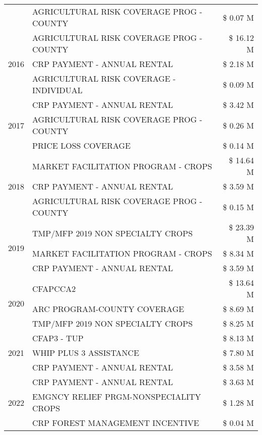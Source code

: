 \begin{tabular}{llr}
 & AGRICULTURAL RISK COVERAGE PROG - COUNTY & \$ 0.07 M \\
\cline{1-3}
\multirow[t]{3}{*}{2016} & AGRICULTURAL RISK COVERAGE PROG - COUNTY & \$ 16.12 M \\
 & CRP PAYMENT - ANNUAL RENTAL & \$ 2.18 M \\
 & AGRICULTURAL RISK COVERAGE - INDIVIDUAL & \$ 0.09 M \\
\cline{1-3}
\multirow[t]{3}{*}{2017} & CRP PAYMENT - ANNUAL RENTAL & \$ 3.42 M \\
 & AGRICULTURAL RISK COVERAGE PROG - COUNTY & \$ 0.26 M \\
 & PRICE LOSS COVERAGE & \$ 0.14 M \\
\cline{1-3}
\multirow[t]{3}{*}{2018} & MARKET FACILITATION PROGRAM - CROPS & \$ 14.64 M \\
 & CRP PAYMENT - ANNUAL RENTAL & \$ 3.59 M \\
 & AGRICULTURAL RISK COVERAGE PROG - COUNTY & \$ 0.15 M \\
\cline{1-3}
\multirow[t]{3}{*}{2019} & TMP/MFP 2019 NON SPECIALTY CROPS & \$ 23.39 M \\
 & MARKET FACILITATION PROGRAM - CROPS & \$ 8.34 M \\
 & CRP PAYMENT - ANNUAL RENTAL & \$ 3.59 M \\
\cline{1-3}
\multirow[t]{3}{*}{2020} & CFAPCCA2 & \$ 13.64 M \\
 & ARC PROGRAM-COUNTY COVERAGE & \$ 8.69 M \\
 & TMP/MFP 2019 NON SPECIALTY CROPS & \$ 8.25 M \\
\cline{1-3}
\multirow[t]{3}{*}{2021} & CFAP3 - TUP & \$ 8.13 M \\
 & WHIP PLUS 3 ASSISTANCE & \$ 7.80 M \\
 & CRP PAYMENT - ANNUAL RENTAL & \$ 3.58 M \\
\cline{1-3}
\multirow[t]{3}{*}{2022} & CRP PAYMENT - ANNUAL RENTAL & \$ 3.63 M \\
 & EMGNCY RELIEF PRGM-NONSPECIALITY CROPS & \$ 1.28 M \\
 & CRP FOREST MANAGEMENT INCENTIVE & \$ 0.04 M \\
\cline{1-3}
\bottomrule
\end{tabular}
